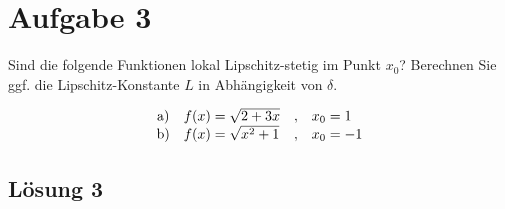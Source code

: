 \documentclass[main.tex]{subfiles}
\begin{document}
\section{Aufgabe 3}
Sind die folgende Funktionen lokal Lipschitz-stetig im Punkt $x_{0}$? Berechnen Sie ggf. die Lipschitz-Konstante $L$ in Abhängigkeit von $\delta$.

\begin{equation*}
    \begin{array}{ c l c l }
        \text{a)} & f( x) =\sqrt{2+3x} & , & x_{0} =1\\
        \text{b)} & f( x) =\sqrt{x^{2} +1} & , & x_{0} =-1
    \end{array}
\end{equation*}

\subsection{Lösung 3}
\end{document}
